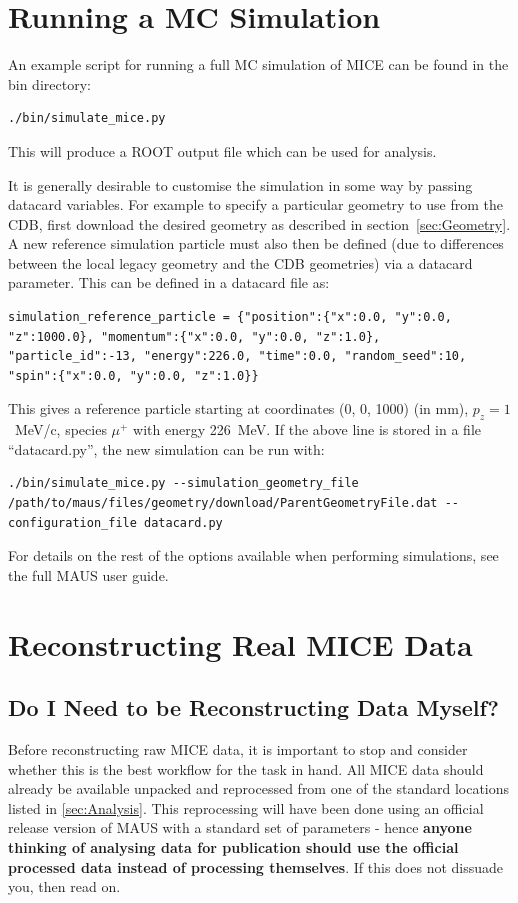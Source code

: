 \documentclass[a4paper,10pt]{article}
\begin{document}
\section{Running a MC Simulation}
\label{sec:Simulation}
  An example script for running a full MC simulation of MICE can be found in the bin directory:
  \begin{lstlisting}
./bin/simulate_mice.py
  \end{lstlisting}
  This will produce a ROOT output file which can be used for analysis.  

  It is generally desirable to customise the simulation in some way by passing datacard variables. For example to specify a particular geometry to use from the CDB, first download the desired geometry as described in section~\ref{sec:Geometry}. A new reference simulation particle must also then be defined (due to differences between the local legacy geometry and the CDB geometries) via a datacard parameter. This can be defined in a datacard file as:
  \begin{lstlisting}
simulation_reference_particle = {"position":{"x":0.0, "y":0.0, "z":1000.0}, "momentum":{"x":0.0, "y":0.0, "z":1.0}, "particle_id":-13, "energy":226.0, "time":0.0, "random_seed":10, "spin":{"x":0.0, "y":0.0, "z":1.0}}
  \end{lstlisting}
  This gives a reference particle starting at coordinates (0, 0, 1000) (in mm), $p_z = 1$~MeV/c, species $\mu^+$ with energy 226~MeV. If the above line is stored in a file ``datacard.py'', the new simulation can be run with:
  \begin{lstlisting}
./bin/simulate_mice.py --simulation_geometry_file /path/to/maus/files/geometry/download/ParentGeometryFile.dat --configuration_file datacard.py 
  \end{lstlisting}
  For details on the rest of the options available when performing simulations, see the full MAUS user guide.

\section{Reconstructing Real MICE Data}
\label{sec:Reconstruction}

  \subsection{Do I Need to be Reconstructing Data Myself?}
  Before reconstructing raw MICE data, it is important to stop and consider whether this is the best workflow for the task in hand. All MICE data should already be available unpacked and reprocessed from one of the standard locations listed in \ref{sec:Analysis}. This reprocessing will have been done using an official release version of MAUS with a standard set of parameters - hence \textbf{anyone thinking of analysing data for publication should use the official processed data instead of processing themselves}. If this does not dissuade you, then read on.
\end{document}

